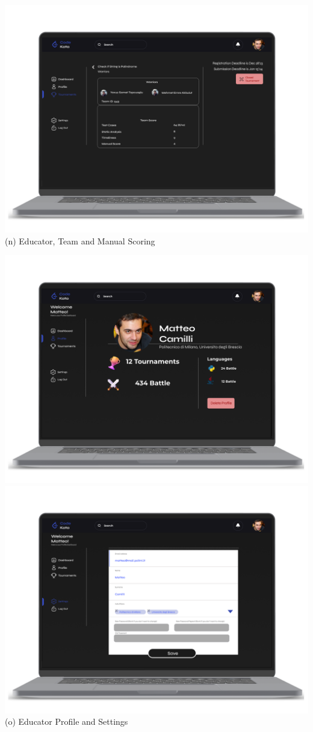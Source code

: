 \begin{center}
\includegraphics[scale=0.13]{Images/ui-ux/educator_team/educator_team_4.png}
        (n) Educator, Team and Manual Scoring
\end{center}
\begin{center}
\includegraphics[scale=0.13]{Images/ui-ux/educator_profile_settings/educator_profile.png}
\includegraphics[scale=0.13]{Images/ui-ux/educator_profile_settings/educator_settings.png}
        (o) Educator Profile and Settings
\end{center}
